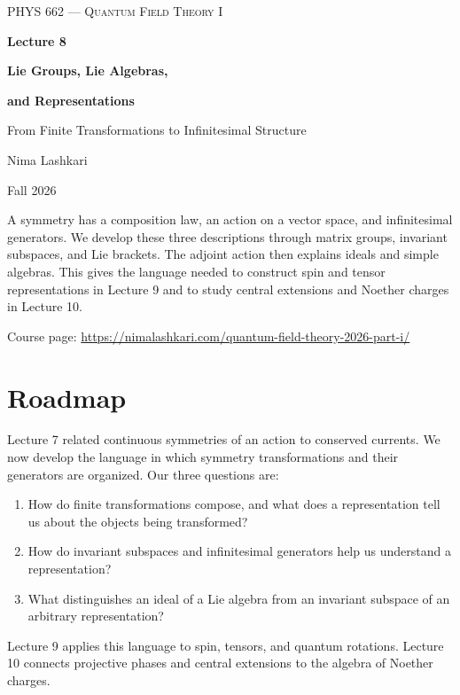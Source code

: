 \documentclass[11pt]{article}
\begin{document}
\begin{titlepage}
\centering
\vspace*{1.2in}
{\scshape\Large PHYS 662 --- Quantum Field Theory I\par}
\vspace{0.35in}
{\Huge\bfseries\color{qftblue} Lecture 8\par}
\vspace{0.15in}
{\LARGE\bfseries Lie Groups, Lie Algebras,\par}
\vspace{0.06in}
{\LARGE\bfseries and Representations\par}
\vspace{0.16in}
{\large\color{qftgreen} From Finite Transformations to Infinitesimal Structure\par}
\vspace{0.6in}
{\large Nima Lashkari\par}
{\large Fall 2026\par}
\vfill
\begin{minipage}{0.86\textwidth}
\small
A symmetry has a composition law, an action on a vector space, and
infinitesimal generators. We develop these three descriptions through
matrix groups, invariant subspaces, and Lie brackets. The adjoint action
then explains ideals and simple algebras. This gives the language needed
to construct spin and tensor representations in Lecture 9 and to study
central extensions and Noether charges in Lecture 10.

\medskip
Course page: \url{https://nimalashkari.com/quantum-field-theory-2026-part-i/}
\end{minipage}
\vspace{0.5in}
\end{titlepage}
\begingroup\small
\tableofcontents
\endgroup
\newpage
{}

\section*{Roadmap}
Lecture 7 related continuous symmetries of an action to conserved
currents. We now develop the language in which symmetry transformations
and their generators are organized. Our three questions are:
\begin{enumerate}
\item How do finite transformations compose, and what does a representation
tell us about the objects being transformed?
\item How do invariant subspaces and infinitesimal generators help us
understand a representation?
\item What distinguishes an ideal of a Lie algebra from an invariant
subspace of an arbitrary representation?
\end{enumerate}
Lecture 9 applies this language to spin, tensors, and quantum rotations.
Lecture 10 connects projective phases and central extensions to the
algebra of Noether charges.
\end{document}
